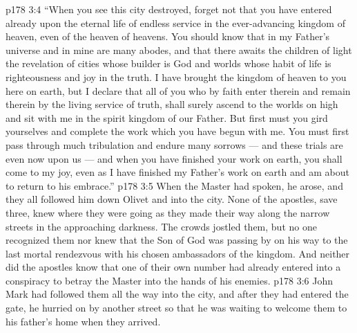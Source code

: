 \vs p178 3:4 \textcolor{ubdarkred}{“When you see this city destroyed, forget not that you have entered already upon the eternal life of endless service in the ever\hyp{}advancing kingdom of heaven, even of the heaven of heavens. You should know that in my Father’s universe and in mine are many abodes, and that there awaits the children of light the revelation of cities whose builder is God and worlds whose habit of life is righteousness and joy in the truth. I have brought the kingdom of heaven to you here on earth, but I declare that all of you who by faith enter therein and remain therein by the living service of truth, shall surely ascend to the worlds on high and sit with me in the spirit kingdom of our Father. But first must you gird yourselves and complete the work which you have begun with me. You must first pass through much tribulation and endure many sorrows --- and these trials are even now upon us --- and when you have finished your work on earth, you shall come to my joy, even as I have finished my Father’s work on earth and am about to return to his embrace.”}
\vs p178 3:5 \pc When the Master had spoken, he arose, and they all followed him down Olivet and into the city. None of the apostles, save three, knew where they were going as they made their way along the narrow streets in the approaching darkness. The crowds jostled them, but no one recognized them nor knew that the Son of God was passing by on his way to the last mortal rendezvous with his chosen ambassadors of the kingdom. And neither did the apostles know that one of their own number had already entered into a conspiracy to betray the Master into the hands of his enemies.
\vs p178 3:6 John Mark had followed them all the way into the city, and after they had entered the gate, he hurried on by another street so that he was waiting to welcome them to his father’s home when they arrived.
